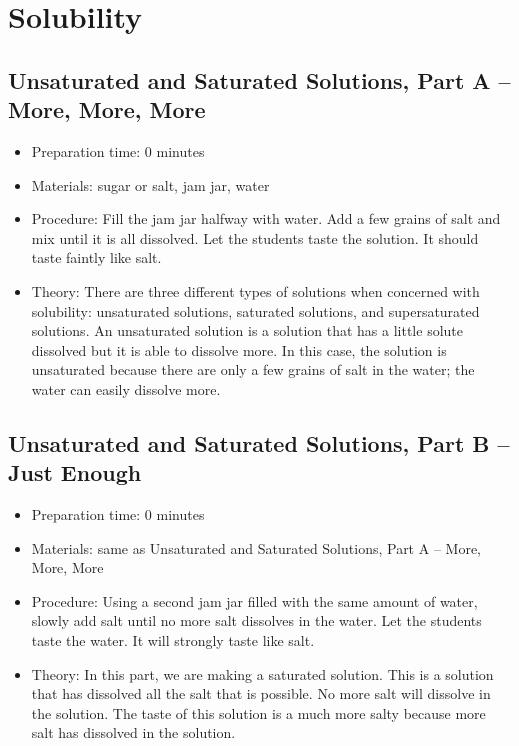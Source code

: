 \section{Solubility}

\subsection{Unsaturated and Saturated Solutions, Part A – More, More, More}
\begin{itemize}
\item{Preparation time: 0 minutes}
\item{Materials: sugar or salt, jam jar, water}
\item{Procedure: Fill the jam jar halfway with water. Add a few grains of salt and mix until it is all dissolved. Let the students taste the solution. It should taste faintly like salt.}
\item{Theory: There are three different types of solutions when concerned with solubility: unsaturated solutions, saturated solutions, and supersaturated solutions. An unsaturated solution is a solution that has a little solute dissolved but it is able to dissolve more. In this case, the solution is unsaturated because there are only a few grains of salt in the water; the water can easily dissolve more.}
\end{itemize}

\subsection{Unsaturated and Saturated Solutions, Part B – Just Enough}
\begin{itemize}
\item{Preparation time: 0 minutes}
\item{Materials: same as Unsaturated and Saturated Solutions, Part A – More, More, More}
\item{Procedure: Using a second jam jar filled with the same amount of water, slowly add salt until no more salt dissolves in the water. Let the students taste the water. It will strongly taste like salt.}
\item{Theory: In this part, we are making a saturated solution. This is a solution that has dissolved all the salt that is possible. No more salt will dissolve in the solution. The taste of this solution is a much more salty because more salt has dissolved in the solution.}
\end{itemize}

